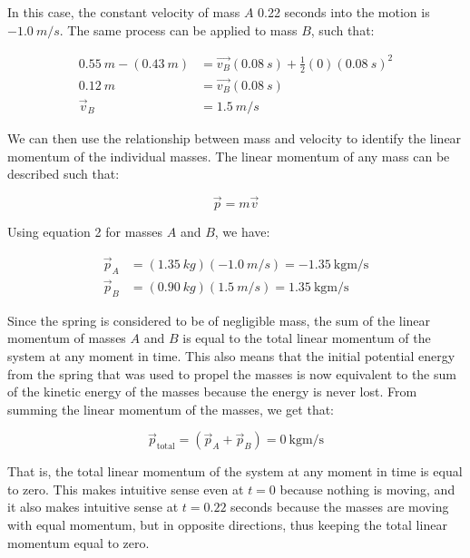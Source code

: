 \documentclass[12pt]{article}
\begin{document}
In this case, the constant velocity of mass $A$ 0.22 seconds into the motion is $\SI{-1.0}{m/s}$. The same process can be applied to mass $B$, such that:

\begin{equation*}
    \begin{split}
        \SI{0.55}{m} - (\SI{0.43}{m}) & = \vec{v_B}(\SI{0.08}{s}) + \frac{1}{2}(0)(\SI{0.08}{s})^2 \\
        \SI{0.12}{m} & = \vec{v_B}(\SI{0.08}{s}) \\
        \vec{v}_B & = \SI{1.5}{m/s}
    \end{split}
\end{equation*}

We can then use the relationship between mass and velocity to identify the linear momentum of the individual masses. The linear momentum of any mass can be described such that:

\begin{equation} \label{eq1}
    \vec{p} = m\vec{v}
\end{equation}

Using equation 2 for masses $A$ and $B$, we have:

\begin{equation*}
    \begin{split}
        \vec{p}_A & = (\SI{1.35}{kg})(\SI{-1.0}{m/s}) = \SI{-1.35}{\kilogram\metre\per\second} \\
        \vec{p}_B & = (\SI{0.90}{kg})(\SI{1.5}{m/s}) = \SI{1.35}{\kilogram\metre\per\second}
    \end{split}
\end{equation*}

Since the spring is considered to be of negligible mass, the sum of the linear momentum of masses $A$ and $B$ is equal to the total linear momentum of the system at any moment in time. This also means that the initial potential energy from the spring that was used to propel the masses is now equivalent to the sum of the kinetic energy of the masses because the energy is never lost. From summing the linear momentum of the masses, we get that:

\begin{equation*}
    \vec{p}_\text{total} = (\vec{p}_A + \vec{p}_B) = \SI{0}{\kilogram\metre\per\second}
\end{equation*}

That is, the total linear momentum of the system at any moment in time is equal to zero. This makes intuitive sense even at $t = 0$ because nothing is moving, and it also makes intuitive sense at $t = 0.22$ seconds because the masses are moving with equal momentum, but in opposite directions, thus keeping the total linear momentum equal to zero.
\end{document}
